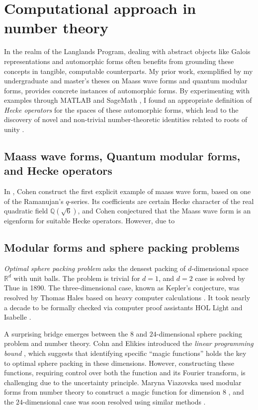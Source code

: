 \documentclass[12pt]{article}
\begin{document}
\section*{Computational approach in number theory}



In the realm of the Langlands Program, dealing with abstract objects like Galois representations and automorphic forms often benefits from grounding these concepts in tangible, computable counterparts.
My prior work, exemplified by my undergraduate and master's theses on Maass wave forms and quantum modular forms, provides concrete instances of automorphic forms.
By experimenting with examples through MATLAB \cite{MATLAB} and SageMath \cite{sagemath}, I found an appropriate definition of \emph{Hecke operators} for the spaces of these automorphic forms, which lead to the discovery of novel and non-trivial number-theoretic identities related to roots of unity \cite{lee2018quantum,lee2019maass}.

\subsection*{Maass wave forms, Quantum modular forms, and Hecke operators}

In \cite{cohen1988q}, Cohen construct the first explicit example of maass wave form, based on one of the Ramanujan's $q$-series.
Its coefficients are certain Hecke character of the real quadratic field $\mathbb{Q}(\sqrt{6})$, and Cohen conjectured that the Maass wave form is an eigenform for suitable Hecke operators.
However, due to 

\subsection*{Modular forms and sphere packing problems}

\emph{Optimal sphere packing problem} asks the densest packing of $d$-dimensional space $\mathbb{R}^{d}$ with unit balls.
The problem is trivial for $d = 1$, and $d = 2$ case is solved by Thue in 1890.
The three-dimensional case, known as Kepler's conjecture, was resolved by Thomas Hales based on heavy computer calculations \cite{hales2005proof}.
It took nearly a decade to be formally checked via computer proof assistants HOL Light and Isabelle \cite{hales2017formal}.


A surprising bridge emerges between the $8$ and $24$-dimensional sphere packing problem and number theory. 
Cohn and Elikies introduced the \emph{linear programming bound}  \cite{cohn2003new}, which suggests that identifying specific ``magic functions'' holds the key to optimal sphere packing in these dimensions. 
However, constructing these functions, requiring control over both the function and its Fourier transform, is challenging due to the uncertainty principle.
Maryna Viazovska used modular forms from number theory to construct a magic function for dimension $8$ \cite{viazovska2017sphere}, and the $24$-dimensional case was soon resolved using similar methods \cite{cohn2017sphere}.
\end{document}
